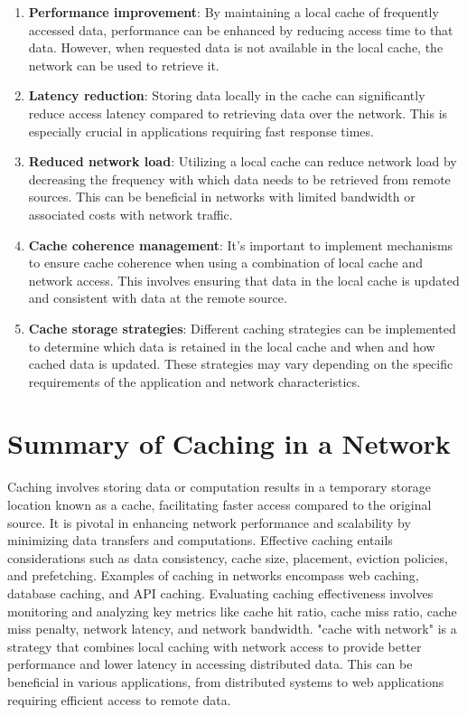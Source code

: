 \documentclass{article}
\begin{document}
\begin{enumerate}[label=\arabic*.]
    \item \textbf{Performance improvement}: By maintaining a local cache of frequently accessed data, performance can be enhanced by reducing access time to that data. However, when requested data is not available in the local cache, the network can be used to retrieve it.
    
    \item \textbf{Latency reduction}: Storing data locally in the cache can significantly reduce access latency compared to retrieving data over the network. This is especially crucial in applications requiring fast response times.
    
    \item \textbf{Reduced network load}: Utilizing a local cache can reduce network load by decreasing the frequency with which data needs to be retrieved from remote sources. This can be beneficial in networks with limited bandwidth or associated costs with network traffic.
    
    \item \textbf{Cache coherence management}: It's important to implement mechanisms to ensure cache coherence when using a combination of local cache and network access. This involves ensuring that data in the local cache is updated and consistent with data at the remote source.
    
    \item \textbf{Cache storage strategies}: Different caching strategies can be implemented to determine which data is retained in the local cache and when and how cached data is updated. These strategies may vary depending on the specific requirements of the application and network characteristics.
\end{enumerate}

\section*{Summary of Caching in a Network}

Caching involves storing data or computation results in a temporary storage location known as a cache, facilitating faster access compared to the original source. It is pivotal in enhancing network performance and scalability by minimizing data transfers and computations. Effective caching entails considerations such as data consistency, cache size, placement, eviction policies, and prefetching. Examples of caching in networks encompass web caching, database caching, and API caching. Evaluating caching effectiveness involves monitoring and analyzing key metrics like cache hit ratio, cache miss ratio, cache miss penalty, network latency, and network bandwidth.
"cache with network" is a strategy that combines local caching with network access to provide better performance and lower latency in accessing distributed data. This can be beneficial in various applications, from distributed systems to web applications requiring efficient access to remote data.
\end{document}
